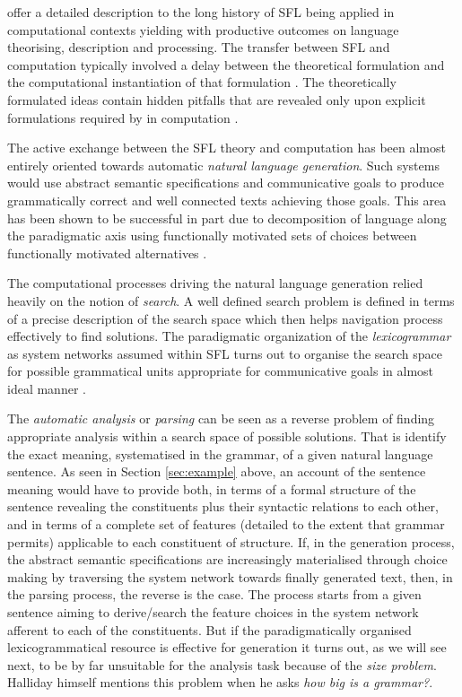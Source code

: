 \citet{ODonnell2005} offer a detailed description to the long history of SFL being applied in computational contexts yielding with productive outcomes on language theorising, description and processing. The transfer between SFL and computation typically involved a delay between the theoretical formulation and the computational instantiation of that formulation \citep[139]{BatemanMatthiessen88} \citep[19]{MatthiessenBateman91}. The theoretically formulated ideas contain hidden pitfalls that are revealed only upon explicit formulations required by in computation \mbox{\citep[27]{Bateman2008}}. 

The active exchange between the SFL theory and computation has been almost entirely oriented towards automatic \textit{natural language generation}. Such systems would use abstract semantic specifications and communicative goals to produce grammatically correct and well connected texts achieving those goals. This area has been shown to be successful in part due to decomposition of language along the paradigmatic axis using functionally motivated sets of choices between functionally motivated alternatives \citep{McDonald80}.

The computational processes driving the natural language generation relied heavily on the notion of \textit{search}. A well defined search problem is defined in terms of a precise description of the search space which then helps navigation process effectively to find solutions. The paradigmatic organization of the \textit{lexicogrammar} as system networks assumed within SFL turns out to organise the search space for possible grammatical units appropriate for communicative goals in almost ideal manner \citep[28]{Bateman2008}.

The \textit{automatic analysis} or \textit{parsing} can be seen as a reverse problem of finding appropriate analysis within a search space of possible solutions. That is identify the exact meaning, systematised in the grammar, of a given natural language sentence. As seen in Section \ref{sec:example} above, an account of the sentence meaning would have to provide both, in terms of a formal structure of the sentence revealing the constituents plus their syntactic relations to each other, and in terms of a complete set of features (detailed to the extent that grammar permits) applicable to each constituent of structure. If, in the generation process, the abstract semantic specifications are increasingly materialised through choice making by traversing the system network towards finally generated text, then, in the parsing process, the reverse is the case. The process starts from a given sentence aiming to derive/search the feature choices in the system network afferent to each of the constituents. But if the paradigmatically organised lexicogrammatical resource is effective for generation it turns out, as we will see next, to be by far unsuitable for the analysis task because of the \textit{size problem}. Halliday himself mentions this problem when he asks \textit{how big is a grammar?}.

